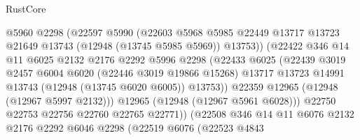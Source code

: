 \begin{lexlean}{RustCore}
\begin{coremodule}
                                @5960
                                @2298
                                (@22597
                                  @5990
                                  (@22603
                                    @5968
                                    @5985
                                    @22449
                                    @13717
                                    @13723
                                    @21649
                                    @13743
                                    (@12948 (@13745 @5985 @5969))
                                    @13753))
                                (@22422
                                  @346
                                  @14
                                  @11
                                  @6025
                                  @2132
                                  @2176
                                  @2292
                                  @5996
                                  @2298
                                  (@22433
                                    @6025
                                    (@22439
                                      @3019
                                      @2457
                                      @6004
                                      @6020
                                      (@22446 @3019 @19866 @15268)
                                      @13717
                                      @13723
                                      @14991
                                      @13743
                                      (@12948 (@13745 @6020 @6005))
                                      @13753))
                                  @22359
                                  @12965
                                  (@12948 (@12967 @5997 @2132)))
                                @12965
                                (@12948 (@12967 @5961 @6028)))
                              @22750
                              @22753
                              @22756
                              @22760
                              @22765
                              @22771))
                          (@22508
                            @346
                            @14
                            @11
                            @6076
                            @2132
                            @2176
                            @2292
                            @6046
                            @2298
                            (@22519
                              @6076
                              (@22523
                                @4843

\end{coremodule}
\end{lexlean}
